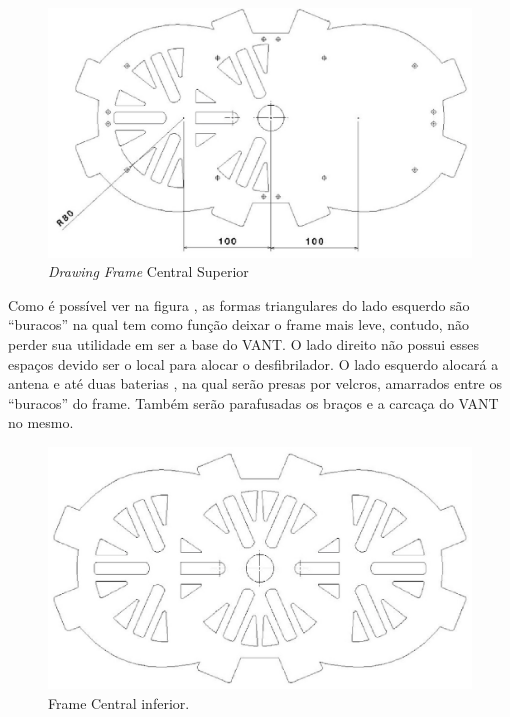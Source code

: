 \begin{figure}[H]
    \centering
      \includegraphics[keepaspectratio=true,scale=0.5]{figuras/drawing.eps}
    \caption{ \textit{Drawing Frame} Central Superior}
    \label{fig:drawing}
\end{figure}

Como é possível ver na figura \label{fig:drawinfinfo}, as formas triangulares do lado esquerdo são “buracos” na qual tem como função deixar o frame mais leve, contudo, não perder sua utilidade em ser a base do VANT. O lado direito não possui esses espaços devido ser o local para alocar o desfibrilador. O lado esquerdo alocará a antena e até duas baterias , na qual serão presas por velcros, amarrados entre os “buracos” do frame. Também serão parafusadas os braços e a carcaça do VANT no mesmo.

\begin{figure}[H]
    \centering
      \includegraphics[keepaspectratio=true,scale=0.5]{figuras/drawinfinfo.eps}
    \caption{ Frame Central inferior.}
    \label{fig:drawinfinfo}
\end{figure}

